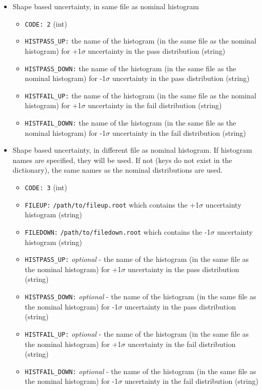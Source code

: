 \documentclass[letter]{article}
\begin{document}
            \begin{itemize}
                \item Shape based uncertainty, in same file as nominal histogram
                \begin{itemize}
                    \item \verb"CODE: 2" (int)
                    \item \verb"HISTPASS_UP:" the name of the histogram (in the same file as the nominal histogram) for +1$\sigma$ uncertainty in the pass distribution (string)
                    \item \verb"HISTPASS_DOWN:" the name of the histogram (in the same file as the nominal histogram) for -1$\sigma$ uncertainty in the pass distribution (string)
                    \item \verb"HISTFAIL_UP:" the name of the histogram (in the same file as the nominal histogram) for +1$\sigma$ uncertainty in the fail distribution (string)
                    \item \verb"HISTFAIL_DOWN:" the name of the histogram (in the same file as the nominal histogram) for -1$\sigma$ uncertainty in the fail distribution (string)

                \end{itemize}
                \item Shape based uncertainty, in different file as nominal histogram. If histogram names are specified, they will be used. If not (keys do not exist in the dictionary), the same names as the nominal distributions are used.
                \begin{itemize}
                    \item \verb"CODE: 3" (int)
                    \item \verb"FILEUP:" \verb"/path/to/fileup.root" which contains the +1$\sigma$ uncertainty histogram (string)
                    \item \verb"FILEDOWN:" \verb"/path/to/filedown.root" which contains the -1$\sigma$ uncertainty histogram (string)
                    \item \verb"HISTPASS_UP:" \textit{optional} - the name of the histogram (in the same file as the nominal histogram) for +1$\sigma$ uncertainty in the pass distribution (string)
                    \item \verb"HISTPASS_DOWN:" \textit{optional} - the name of the histogram (in the same file as the nominal histogram) for -1$\sigma$ uncertainty in the pass distribution (string)
                    \item \verb"HISTFAIL_UP:" \textit{optional} - the name of the histogram (in the same file as the nominal histogram) for +1$\sigma$ uncertainty in the fail distribution (string)
                    \item \verb"HISTFAIL_DOWN:" \textit{optional} - the name of the histogram (in the same file as the nominal histogram) for -1$\sigma$ uncertainty in the fail distribution (string)
                \end{itemize}
            \end{itemize}
\end{document}
